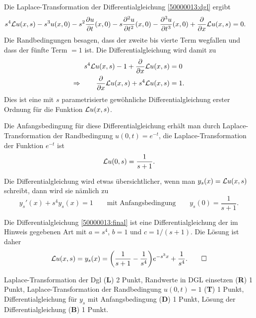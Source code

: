 \begin{loesung}
\begin{teilaufgaben}
\item
Die Laplace-Transformation der Differentialgleichung \eqref{50000013:dgl}
ergibt
\begin{align*}
s^4 {\cal L}u(x,s)
-s^3 u(x,0)
-s^2\frac{\partial u}{\partial t}(x,0)
-s\frac{\partial^2 u}{\partial t^2}(x,0)
-\frac{\partial^3 u}{\partial t^3}(x,0)
+
\frac{\partial}{\partial x}{\cal L}u(x,s)
&=
0.
\end{align*}
Die Randbedingungen besagen, dass der zweite bis vierte Term wegfallen
und dass der fünfte Term $=1$ ist.
Die Differentialgleichung wird damit zu
\begin{align*}
s^4 {\cal L}u(x,s)
-1
+
\frac{\partial}{\partial x}{\cal L}u(x,s)
&=
0
\\
\Rightarrow\qquad
\frac{\partial}{\partial x}{\cal L}u(x,s)
+
s^4 {\cal L}u(x,s)
&=
1.
\end{align*}
Dies ist eine mit $s$ parametrisierte gewöhnliche Differentialgleichung
erster Ordnung für die Funktion ${\cal L}u(x,s)$.

Die Anfangsbedingung für diese Differentialgleichung erhält man durch
Laplace-Transformation der Randbedingung $u(0,t)=e^{-t}$,
die Laplace-Transformation der Funktion $e^{-t}$ ist
\[
{\cal L}u(0,s) = \frac1{s+1}.
\]

Die Differentialgleichung wird etwas übersichtlicher, wenn man
$y_s(x) = {\cal L}u(x,s)$ schreibt, dann wird sie nämlich zu
\begin{equation}
y_s'(x) + s^4 y_s(x)=1
\qquad\text{mit Anfangsbedingung}\qquad
y_s(0)=\frac1{s+1}.
\label{50000013:final}
\end{equation}

\item
Die Differentialgleichung \eqref{50000013:final} ist eine Differentialgleichung
der im Hinweis gegebenen Art mit $a=s^4$, $b=1$ und $c=1/(s+1)$.
Die Lösung ist daher
\[
{\cal L}u(x,s)
=
y_s(x)
=
\biggl(\frac1{s+1}-\frac1{s^4}\biggr)e^{-s^3x} + \frac{1}{s^4}.
\qedhere
\]
\end{teilaufgaben}
\end{loesung}

\begin{bewertung}
Laplace-Transformation der Dgl ({\bf L}) 2 Punkt,
Randwerte in DGL einsetzen ({\bf R}) 1 Punkt,
Laplace-Transformation der Randbedingung $u(0,t)=1$ ({\bf T}) 1 Punkt,
Differentialgleichung für $y_s$ mit Anfangsbedingung ({\bf D}) 1 Punkt,
Lösung der Differentialgleichung ({\bf B}) 1 Punkt.
\end{bewertung}
